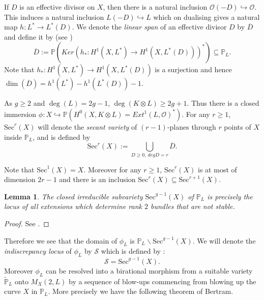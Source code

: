 \documentclass[12pt, reqno]{amsart}
\newtheorem{proposition}[theorem]{Proposition}
\newtheorem{lemma}[theorem]{Lemma}
\newcommand{\Sec}{\textrm{Sec}}
\begin{document}
   
    If $D$ is an effective divisor on $X$, then there is a natural inclusion $\mathcal{O}(-D)\hookrightarrow \mathcal{O}$. This induces a natural inclusion $L(-D)\hookrightarrow L$ which on dualising gives a natural map $h:L^{*}\rightarrow L^{*}(D)$. 
    We denote the {\it linear span} of an effective divisor $D$ by $\overline{D}$ and define it by (see \cite{ln})    \[\overline{D}:=\mathbb{P}(Ker(h_{*}:H^{1}(X,L^{*})\rightarrow H^{1}(X,L^{*}(D)))^{*})\subseteq \mathbb{P}_{L}.\]
    Note that $h_{*}: H^{1}(X,L^{*})\rightarrow H^{1}(X,L^{*}(D))$ is a surjection and hence $\dim(\overline{D})= h^{1}(L^{*})-h^{1}(L^{*}(D))-1$.

As $g\geq 2$ and $\deg(L)=2g-1$, $\deg(K\otimes L)\geq 2g+1$. Thus there is a closed immersion $\phi:X\hookrightarrow \mathbb{P}(H^{0}(X,K\otimes L)=Ext^{1}(L,\mathcal{O})^{*})$. 
    For any $r\geq 1$, $\Sec^{r}(X)$ will denote the {\it secant variety} of $(r-1)$-planes through $r$ points of $X$ inside $\mathbb{P}_{L}$, and is defined by 
\[\Sec^{r}(X):=\bigcup_{D\geq 0,~ degD=r}\overline{D}.\]

Note that $\Sec^{1}(X)=X$. Moreover for any $r\geq 1$, $\Sec^{r}(X)$ is at most of dimension $2r-1$ and there is an inclusion $\Sec^{r}(X)\subseteq \Sec^{r+1}(X)$.

\begin{lemma}\label{3.1}
The closed irreducible subvariety $\Sec^{g-1}(X)$ of $\mathbb{P}_{L}$ is precisely the locus of all extensions which determine rank $2$ bundles that are not stable.
    \end{lemma}
    \begin{proof}
        See \cite[Pg. 451]{b}.
    \end{proof}
 
 Therefore we see that the domain of $\phi_{L}$ is $\mathbb{P}_{L}\backslash \Sec^{g-1}(X)$. We will denote the {\it indiscrepancy locus} of $\phi_{L}$ by $\mathcal{S}$ which is defined by :
\begin{equation}\label{bb}
\mathcal{S}=\Sec^{g-1}(X).
\end{equation}
Moreover $\phi_{L}$ can be resolved into a birational morphism from a suitable variety $\widetilde{\mathbb{P}}_{L}$ onto $M_{X}(2,L)$ by a sequence of blow-ups commencing from blowing up the curve $X$ in $\mathbb{P}_{L}$. More precisely we have the following theorem of Bertram.
\end{document}

